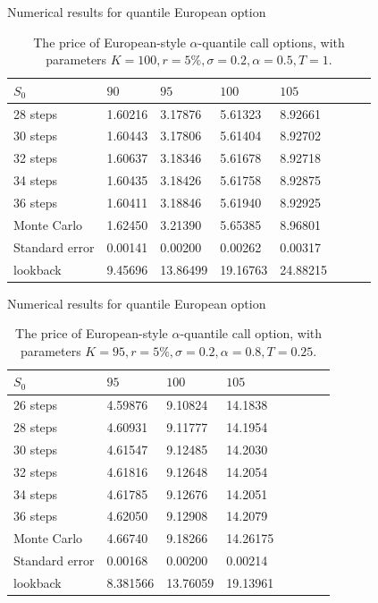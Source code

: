 \documentclass[cjk]{beamer}
\begin{document}
\begin{frame}{Numerical results for quantile European option}
\begin{table}
\caption{The price of European-style $\alpha$-quantile call options, with parameters
	$K=100, r=5\%, \sigma=0.2, \alpha=0.5, T=1$. }
\begin{center}
\begin{tabular}{l|lllllll}
 $S_0$ & $90$ & $95$ & $100$ & $105$ \\
\hline
28 steps & 1.60216 & 3.17876 & 5.61323 & 8.92661\\
30 steps & 1.60443 & 3.17806 & 5.61404 & 8.92702\\
32 steps & 1.60637 & 3.18346 & 5.61678 & 8.92718\\ 
34 steps & 1.60435 & 3.18426 & 5.61758 & 8.92875\\
36 steps & 1.60411 & 3.18846 & 5.61940 & 8.92925\\
\hline
Monte Carlo & 1.62450 & 3.21390 &  5.65385 & 8.96801 \\
Standard error & 0.00141 & 0.00200 & 0.00262 & 0.00317 \\
\hline
lookback & 9.45696 & 13.86499 & 19.16763 & 24.88215
\end{tabular}
\end{center}
\label{fig:euro5}
\end{table}%
\end{frame}

\begin{frame}{Numerical results for quantile European option}
\begin{table}
\caption{The price of European-style $\alpha$-quantile call option,
	with parameters
	$K=95, r=5\%, \sigma=0.2, \alpha=0.8, T=0.25$. }
\begin{center}
\begin{tabular}{l|lllllll}
$S_0$ & $95$ & $100$ & $105$        \\
\hline
26 steps & 4.59876 & 9.10824 & 14.1838 \\
28 steps & 4.60931 & 9.11777 & 14.1954 \\
30 steps & 4.61547 & 9.12485 & 14.2030 \\
32 steps & 4.61816 & 9.12648 & 14.2054 \\
34 steps & 4.61785 & 9.12676 & 14.2051 \\
36 steps & 4.62050 & 9.12908 & 14.2079 \\
\hline
Monte Carlo & 4.66740 & 9.18266 & 14.26175\\
Standard error & 0.00168 & 0.00200 &  0.00214\\
\hline
lookback & 8.381566 &  13.76059 & 19.13961
\end{tabular}
\end{center}
\label{fig:euro8}
\end{table}%
\end{frame}
\end{document}
